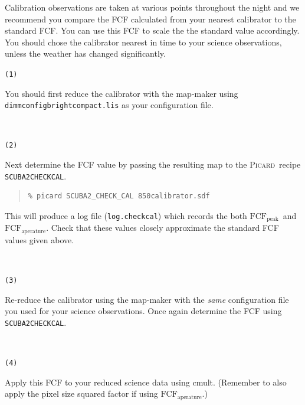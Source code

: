 \documentclass[twoside,11pt]{article}
\newcommand{\xref}[3]{#1}
\renewcommand{\_}{\texttt{\symbol{95}}}
\newenvironment{myquote}{\begin{quote}\begin{small}}{\end{small}\end{quote}}
\newcommand{\fcfb}{$\mathrm{FCF_{peak}}$}
\newcommand{\fcfa}{$\mathrm{FCF_{aperature}}$}
\newcommand{\picard}{\xref{\textsc{Picard}}{sun265}{}}
\newcommand{\drrecipe}[1]{\texttt{#1}}
\newcommand{\task}[1]{\textsf{#1}}
\newcommand{\cmult}{\xref{\task{cmult}}{sun95}{CMULT}}
\begin{document}
Calibration observations are taken at various points throughout the
night and we recommend you compare the FCF calculated from your
nearest calibrator to the standard FCF. You can use this FCF to scale
the the standard value accordingly. You should chose the calibrator
nearest in time to your science observations, unless the weather has
changed significantly.
\vspace{1mm}\\
\begin{minipage}[t]{0.05\linewidth}
\texttt{(1)}
\end{minipage}
\begin{minipage}[t]{0.95\linewidth}
 You should first reduce the calibrator with the map-maker using
 \texttt{dimmconfig\_bright\_compact.lis} as your configuration file.
\end{minipage}
\vspace{1mm}\\
\begin{minipage}[t]{0.05\linewidth}
\texttt{(2)}
\end{minipage}
\begin{minipage}[t]{0.95\linewidth}
Next determine the FCF value by passing the resulting map to the
\picard\ recipe \xref{\drrecipe{SCUBA2\_CHECK\_CAL}}{sun265}{SCUBA2_CHECK_CAL}.
\begin{myquote}
\begin{verbatim}
% picard SCUBA2_CHECK_CAL 850calibrator.sdf
\end{verbatim}
\end{myquote}
This will produce a log file (\texttt{log.checkcal}) which records the both
\fcfb\ and \fcfa. Check that these values closely approximate the
standard FCF values given above.
\end{minipage}
\vspace{1mm}\\
\begin{minipage}[t]{0.05\linewidth}
\texttt{(3)}
\end{minipage}
\begin{minipage}[t]{0.95\linewidth}
Re-reduce the calibrator using the map-maker with the \emph{same}
configuration file you used for your science observations. Once again
determine the FCF using \drrecipe{SCUBA2\_CHECK\_CAL}.
\end{minipage}
\vspace{1mm}\\
\begin{minipage}[t]{0.05\linewidth}
\texttt{(4)}
\end{minipage}
\begin{minipage}[t]{0.95\linewidth}
Apply this FCF to your reduced science data using \cmult. (Remember to
also apply the pixel size squared factor if using \fcfa.)
\end{minipage}
\end{document}
